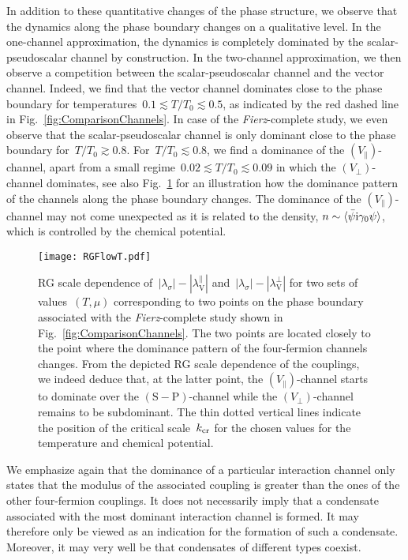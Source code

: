 \documentclass[prd,english,preprintnumbers,amsmath,amssymb,nofootinbib,twocolumn,superscriptaddress]{revtex4-1}
\begin{document}
{{In addition to these quantitative changes of the phase structure, we observe that the dynamics along
the phase boundary changes on a qualitative level. In the one-channel approximation, the dynamics is completely
dominated by the scalar-pseudoscalar channel by construction. In the two-channel approximation, we then observe
a competition between the scalar-pseudoscalar channel and the vector channel. Indeed, we find that the {vector channel
dominates  
close to} the phase boundary for temperatures~$0.1 \lesssim T/T_0 \lesssim 0.5$, as indicated 
by the red dashed line in Fig.~\ref{fig:ComparisonChannels}. In case of the {\it Fierz}-complete study, we even
observe that the scalar-pseudoscalar channel is only dominant close to the phase boundary for~$T/T_0 \gtrsim 0.8$. 
For~$T/T_0 \lesssim 0.8$, we find a dominance of the $(V_{\parallel})$-channel,
{apart from a small regime~$0.02 \lesssim T/T_0\lesssim 0.09$ in which 
the $(V_{\perp})$-channel {dominates, see also Fig.~\ref{fig:RGFlowT} for an
illustration how the dominance pattern of the channels along the phase boundary changes.}
The dominance of the $(V_{\parallel})$-channel} may not come unexpected 
as it is related to the density, $n \sim \langle \bar{\psi}{\rm i}\gamma_0\psi\rangle$,
which is controlled by the chemical potential.
%
\begin{figure}[t]
\center
\texttt{[image: RGFlowT.pdf]}
\caption{RG scale dependence of~$|\lambda_{\sigma}|-|\lambda_{\text{V}}^{\parallel}|$
and~\mbox{$|\lambda_{\sigma}|-|\lambda_{\text{V}}^{\perp}|$} for two sets of values~$(T,\mu)$ corresponding
to two points on the phase boundary associated with the {\it Fierz}-complete study 
shown in Fig.~\ref{fig:ComparisonChannels}. The two points are located closely to the point where the 
dominance pattern of the four-fermion channels changes. From the depicted RG scale dependence 
of the couplings, we indeed deduce that,
at the latter point, the $(V_{\parallel})$-channel starts to dominate over the $\left(\text{S} - \text{P} \right)$-channel while the
$(V_{\perp})$-channel remains to be subdominant. The thin dotted vertical lines indicate
the position of the critical scale~$k_{\rm cr}$ for the chosen values for the temperature and chemical potential.} 
\label{fig:RGFlowT}
\end{figure}
%

We emphasize again that the dominance of a particular interaction channel only states that the modulus 
of the associated coupling is greater than the ones of the other four-fermion couplings. It does not necessarily imply
that a condensate associated with the most dominant interaction channel is formed. It may therefore only be viewed as an indication
for the formation of such a condensate. Moreover, it may very well be that condensates of different types coexist. 

}}
\end{document}
